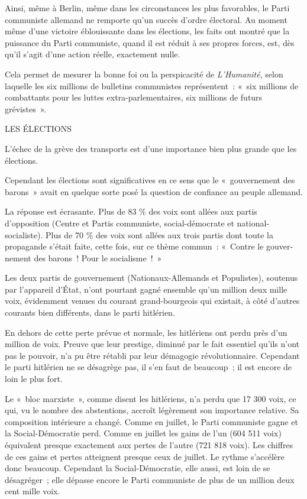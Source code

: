 \documentclass[french,twoside]{book} %
\begin{document}
Ainsi, même à Berlin, même dans les circonstances les plus favorables, le Parti communiste allemand ne remporte qu'un succès d'ordre électoral. Au moment même d'une victoire éblouissante dans les élections, les faits ont montré que la puissance du Parti communiste, quand il est réduit à ses propres forces, est, dès qu'il s'agit d'une action réelle, exactement nulle.\par
Cela permet de mesurer la bonne foi ou la perspicacité de {\itshape L'Humanité}, selon laquelle les six millions de bulletins communistes représentent : « six millions de combattants pour les luttes extra-parlementaires, six millions de futurs grévistes ».\par
LES ÉLECTIONS\par
L'échec de la grève des transports est d'une importance bien plus grande que les élections.\par
Cependant les élections sont significatives en ce sens que le « gouverne­ment des barons » avait en quelque sorte posé la question de confiance au peuple allemand.\par
La réponse est écrasante. Plus de 83 \% des voix sont allées aux partis d'opposition (Centre et Partis communiste, social-démocrate et national-socialiste). Plus de 70 \% des voix sont allées aux trois partis dont toute la propagande s'était faite, cette fois, sur ce thème commun : « Contre le gouver­nement des barons ! Pour le socialisme ! »\par
Les deux partis de gouvernement (Nationaux-Allemands et Populistes), soutenus par l'appareil d'État, n'ont pourtant gagné ensemble qu'un million deux mille voix, évidemment venues du courant grand-bourgeois qui existait, à côté d'autres courants bien différents, dans le parti hitlérien.\par
En dehors de cette perte prévue et normale, les hitlériens ont perdu près d'un million de voix. Preuve que leur prestige, diminué par le fait essentiel qu'ils n'ont pas le pouvoir, n'a pu être rétabli par leur démagogie révolution­naire. Cependant le parti hitlérien ne se désagrège pas, il s'en faut de beaucoup ; il est encore de loin le plus fort.\par
Le « bloc marxiste », comme disent les hitlériens, n'a perdu que 17 300 voix, ce qui, vu le nombre des abstentions, accroît légèrement son importance relative. Sa composition intérieure a changé. Comme en juillet, le Parti communiste gagne et la Social-Démocratie perd. Comme en juillet les gains de l'un (604 511 voix) équivalent presque exactement aux pertes de l'autre (721 818 voix). Les chiffres de ces gains et pertes atteignent presque ceux de juillet. Le rythme s'accélère donc beaucoup. Cependant la Social-Démocratie, elle aussi, est loin de se désagréger ; elle dépasse encore le Parti communiste de plus de un million deux cent mille voix.\par
\end{document}

